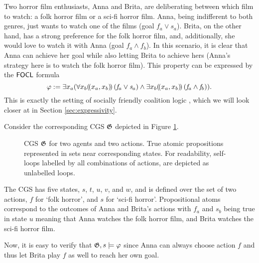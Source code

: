 \documentclass[sigconf,anonymous]{aamas}
\begin{document}
\begin{example}
    Two horror film enthusiasts, Anna and Brita, are deliberating between which film to watch: a folk horror film or a sci-fi horror film. Anna, being indifferent to both genres, just wants to watch one of the films (goal $f_a \lor s_a$). Brita, on the other hand, has a strong preference for the folk horror film, and, additionally, she would love to watch it with Anna (goal $f_a \land f_b$). In this scenario, it is clear that Anna can achieve her goal while also letting Brita to achieve hers (Anna's strategy here is to watch the folk horror film). This property can be expressed by the $\mathsf{FOCL}$ formula 
    $$\varphi:=\exists x_a (\forall x_b (\!( x_a, x_b )\!)\,(\mathit{f}_a \lor \mathit{s}_a) \land \exists x_b (\!( x_a, x_b )\!)\,(\mathit{f}_a \land \mathit{f}_b)).$$
    This is exactly the setting of socially friendly coalition logic \cite{goranko18}, which we will look closer at in Section \ref{sec:expressivity}.     

    Consider the corresponding CGS $\mathfrak{G}$ depicted in Figure \ref{fig::horror}.
    \begin{figure}[h!]
\centering
{}
\caption{CGS $\mathfrak{G}$ for two agents and two actions. True atomic propositions represented in sets near corresponding states. For readability, self-loops labelled by all combinations of actions, are depicted as unlabelled loops.}
\label{fig::horror}
\end{figure} 
The CGS has five states, $s$, $t$, $u$, $v$, and $w$, and is defined over the set of two actions, $f$ for `folk horror', and $s$ for `sci-fi horror'. Propositional atoms correspond to the outcomes of Anna and Brita's actions with $f_a$ and $s_b$ being true in state $u$ meaning that Anna watches the folk horror film, and Brita watches the sci-fi horror film. 

Now, it is easy to verify that $\mathfrak{G},s \models \varphi$ since Anna can always choose action $f$ and thus let Brita play $f$ as well to reach her own goal. 
\end{example}
\end{document}
